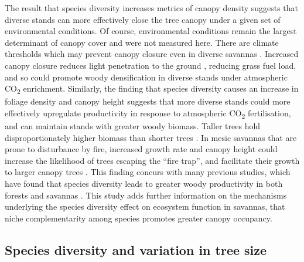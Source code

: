 \begin{refsection}
The result that species diversity increases metrics of canopy density suggests that diverse stands can more effectively close the tree canopy under a given set of environmental conditions. Of course, environmental conditions remain the largest determinant of canopy cover and were not measured here. There are climate thresholds which may prevent canopy closure even in diverse savannas \citep{Devine2017}. Increased canopy closure reduces light penetration to the ground \citep{Pilon2020}, reducing grass fuel load, and so could promote woody densification in diverse stands under atmospheric CO\textsubscript{2} enrichment. Similarly, the finding that species diversity causes an increase in foliage density and canopy height suggests that more diverse stands could more effectively upregulate productivity in response to atmospheric CO\textsubscript{2} fertilisation, and can maintain stands with greater woody biomass. Taller trees hold disproportionately higher biomass than shorter trees \citep{King1990}. In mesic savannas that are prone to disturbance by fire, increased growth rate and canopy height could increase the likelihood of trees escaping the ``fire trap'', and facilitate their growth to larger canopy trees \citep{Wakeling2011}. This finding concurs with many previous studies, which have found that species diversity leads to greater woody productivity in both forests and savannas \citep{Plas2019, Liang2016}. This study adds further information on the mechanisms underlying the species diversity effect on ecosystem function in savannas, that niche complementarity among species promotes greater canopy occupancy.

\subsection{Species diversity and variation in tree size}
\label{tls:ssec:diversity}


\end{refsection}
